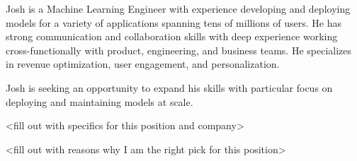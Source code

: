 \makelettertitle

\begin{cvletter}

Josh is a Machine Learning Engineer with experience developing and deploying models for a variety of applications spanning tens of millions of users. 
He has strong communication and collaboration skills with deep experience working cross-functionally with product, engineering, and business teams. 
He specializes in revenue optimization, user engagement, and personalization.

Josh is seeking an opportunity to expand his skills with particular focus on deploying and maintaining models at scale.

<fill out with specifics for this position and company>

<fill out with reasons why I am the right pick for this position>

\end{cvletter}


\makeletterclosing


